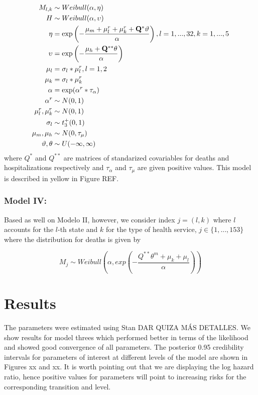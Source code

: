 \documentclass[10pt,letterpaper]{article}
\begin{document}
\[
\begin{aligned}
 M_{l,k}   &\sim Weibull(\alpha,\mathbf{\eta})\\
 H  &\sim Weibull(\alpha,\mathbf{\upsilon}) \\
 \mathbf{\eta} &= \exp \left(-\frac{\mu_m+\mathbf{\mu}_l^r+\mathbf{\mu}_k^r+\mathbf{Q}^*\mathbf{\vartheta}}{\alpha} \right),\space\space l=1,...,32,\space k=1,...,5\\
 \mathbf{\upsilon} &= \exp\left(-\frac{\mu_h+\mathbf{Q}^{**}\mathbf{\theta}}{\alpha}\right) \\
  \mathbf{\mu}_l&=\sigma_l*\mathbf{\mu}_l^r, \space\space l=1,2 \\
 \mathbf{\mu}_k&=\sigma_l*\mathbf{\mu}_k^r \\
 \alpha&=\exp(\alpha^r*\tau_\alpha) \\
 \alpha^r&\sim N(0,1) \\
 \mu^r_l,\mu^r_k &\sim N(0,1) \\
 \sigma_l&\sim t^+_3(0,1) \\
 \mu_m,\mu_h &\sim N(0,\tau_\mu) \\
 \mathbf{\vartheta},\mathbf{\theta} &\sim U(-\infty,\infty) \\
\end{aligned}
\] where \(Q^*\) and \(Q^{**}\) are matrices of standarized covariables
for deaths and hospitalizations respectively and \(\tau_\alpha\) and
\(\tau_{\mu}\) are given positive values. This model is described in
yellow in Figure REF.

\subsubsection{Model IV:}\label{model-iv}

Based as well on Modelo II, however, we consider index \(j=(l,k)\) where
\(l\) accounts for the \(l\)-th state and \(k\) for the type of health
service, \(j \in \{1,...,153\}\) where the distribution for deaths is
given by

\[M_j \sim Weibull\left(\alpha, exp\left(-\frac{Q^{**}\theta^m+\mu_k+\mu_l}{\alpha} \right) \right)\]

\section{Results}\label{results}

The parameters were estimated using Stan DAR QUIZA MÁS DETALLES. We show
results for model threes which performed better in terms of the
likelihood and showed good convergence of all parameters. The posterior
0.95 credibility intervals for parameters of interest at different
levels of the model are shown in Figures xx and xx. It is worth pointing
out that we are displaying the log hazard ratio, hence positive values
for parameters will point to increasing risks for the corresponding
transition and level.
\end{document}
